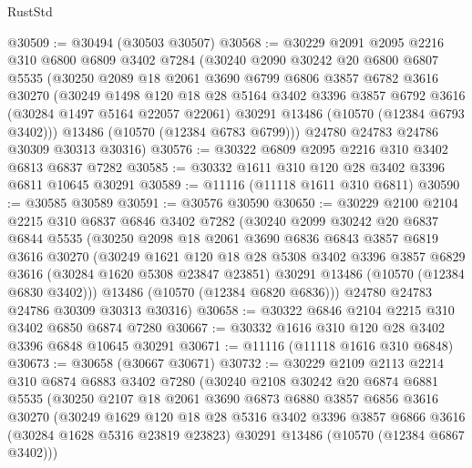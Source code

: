 \begin{lexlean}{RustStd}
\begin{coremodule}
@30509 := @30494 (@30503 @30507)
@30568 := @30229
    @2091
    @2095
    @2216
    @310
    @6800
    @6809
    @3402
    @7284
    (@30240
      @2090
      @30242
      @20
      @6800
      @6807
      @5535
      (@30250
        @2089
        @18
        @2061
        @3690
        @6799
        @6806
        @3857
        @6782
        @3616
        @30270
        (@30249
          @1498
          @120
          @18
          @28
          @5164
          @3402
          @3396
          @3857
          @6792
          @3616
          (@30284 @1497 @5164 @22057 @22061)
          @30291
          @13486
          (@10570 (@12384 @6793 @3402)))
        @13486
        (@10570 (@12384 @6783 @6799)))
      @24780
      @24783
      @24786
      @30309
      @30313
      @30316)
@30576 := @30322 @6809 @2095 @2216 @310 @3402 @6813 @6837 @7282
@30585 := @30332 @1611 @310 @120 @28 @3402 @3396 @6811 @10645 @30291
@30589 := @11116 (@11118 @1611 @310 @6811)
@30590 := @30585 @30589
@30591 := @30576 @30590
@30650 := @30229
    @2100
    @2104
    @2215
    @310
    @6837
    @6846
    @3402
    @7282
    (@30240
      @2099
      @30242
      @20
      @6837
      @6844
      @5535
      (@30250
        @2098
        @18
        @2061
        @3690
        @6836
        @6843
        @3857
        @6819
        @3616
        @30270
        (@30249
          @1621
          @120
          @18
          @28
          @5308
          @3402
          @3396
          @3857
          @6829
          @3616
          (@30284 @1620 @5308 @23847 @23851)
          @30291
          @13486
          (@10570 (@12384 @6830 @3402)))
        @13486
        (@10570 (@12384 @6820 @6836)))
      @24780
      @24783
      @24786
      @30309
      @30313
      @30316)
@30658 := @30322 @6846 @2104 @2215 @310 @3402 @6850 @6874 @7280
@30667 := @30332 @1616 @310 @120 @28 @3402 @3396 @6848 @10645 @30291
@30671 := @11116 (@11118 @1616 @310 @6848)
@30673 := @30658 (@30667 @30671)
@30732 := @30229
    @2109
    @2113
    @2214
    @310
    @6874
    @6883
    @3402
    @7280
    (@30240
      @2108
      @30242
      @20
      @6874
      @6881
      @5535
      (@30250
        @2107
        @18
        @2061
        @3690
        @6873
        @6880
        @3857
        @6856
        @3616
        @30270
        (@30249
          @1629
          @120
          @18
          @28
          @5316
          @3402
          @3396
          @3857
          @6866
          @3616
          (@30284 @1628 @5316 @23819 @23823)
          @30291
          @13486
          (@10570 (@12384 @6867 @3402)))

\end{coremodule}
\end{lexlean}
